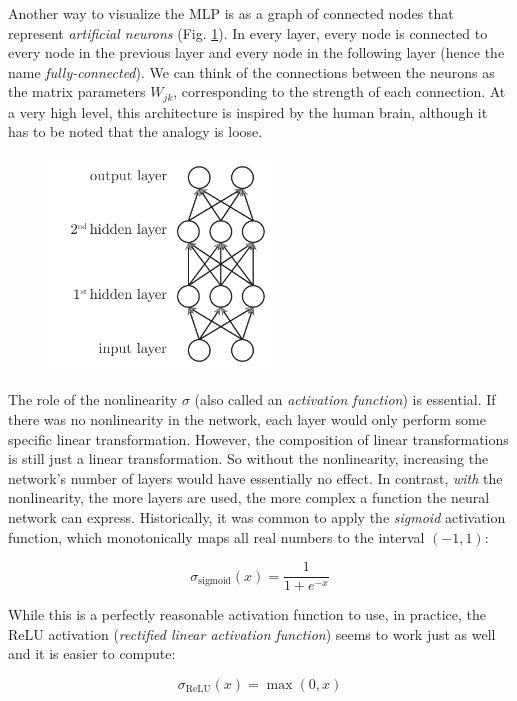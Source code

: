 \documentclass[12pt]{article}
\begin{document}
Another way to visualize the MLP is as a graph of connected nodes that represent \textit{artificial neurons} (Fig. \ref{fig_mlp}). In every layer, every node is connected to every node in the previous layer and every node in the following layer (hence the name \textit{fully-connected}). We can think of the connections between the neurons as the matrix parameters $W_{jk}$, corresponding to the strength of each connection. At a very high level, this architecture is inspired by the human brain, although it has to be noted that the analogy is loose.

\begin{figure}[ht]
\centering
\includegraphics[width=6cm]{illustrations/mlp.pdf}
\caption{}
\label{fig_mlp}
\end{figure}

The role of the nonlinearity $\sigma$ (also called an \textit{activation function}) is essential. If there was no nonlinearity in the network, each layer would only perform some specific linear transformation. However, the composition of linear transformations is still just a linear transformation. So without the nonlinearity, increasing the network's number of layers would have essentially no effect. In contrast, \textit{with} the nonlinearity, the more layers are used, the more complex a function the neural network can express. Historically, it was common to apply the \textit{sigmoid} activation function, which monotonically maps all real numbers to the interval $(-1, 1)$:

\begin{equation}
\sigma_{\textrm{sigmoid}}(x) = \frac{1}{1 + e^{-x}}
\end{equation}

While this is a perfectly reasonable activation function to use, in practice, the ReLU activation (\textit{rectified linear activation function}) seems to work just as well and it is easier to compute:

\begin{equation}
\sigma_{\textrm{ReLU}}(x) = \max(0, x)
\end{equation}
\end{document}
